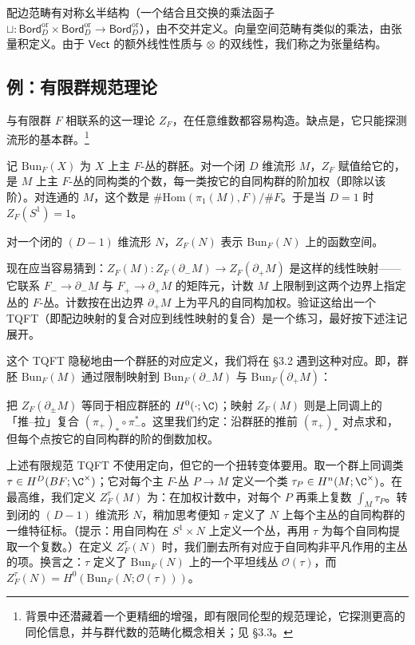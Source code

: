配边范畴有对称幺半结构（一个结合且交换的乘法函子 $\sqcup\colon\mathsf{Bord}^{\mathrm{or}}_D\times\mathsf{Bord}^{\mathrm{or}}_D\to\mathsf{Bord}^{\mathrm{or}}_D$），由不交并定义。向量空间范畴有类似的乘法，由张量积定义。由于 $\mathsf{Vect}$ 的额外线性性质与 $\otimes$ 的双线性，我们称之为张量结构。

\subsection{例：有限群规范理论}

与有限群 $F$ 相联系的这一理论 $Z_F$，在任意维数都容易构造。缺点是，它只能探测流形的基本群。\footnote{背景中还潜藏着一个更精细的增强，即有限同伦型的规范理论，它探测更高的同伦信息，并与群代数的范畴化概念相关；见 §3.3。}

记 $\mathrm{Bun}_F(X)$ 为 $X$ 上主 $F$-丛的群胚。对一个闭 $D$ 维流形 $M$，$Z_F$ 赋值给它的，是 $M$ 上主 $F$-丛的同构类的个数，每一类按它的自同构群的阶加权（即除以该阶）。对连通的 $M$，这个数是 $\#\mathrm{Hom}(\pi_1(M),F)/\#F$。于是当 $D=1$ 时 $Z_F(S^1)=1$。

对一个闭的 $(D-1)$ 维流形 $N$，$Z_F(N)$ 表示 $\mathrm{Bun}_F(N)$ 上的函数空间。

现在应当容易猜到：$Z_F(M)\colon Z_F(\partial_-M)\to Z_F(\partial_+M)$ 是这样的线性映射——它联系 $F_-\to\partial_-M$ 与 $F_+\to\partial_+M$ 的矩阵元，计数 $M$ 上限制到这两个边界上指定丛的 $F$-丛。计数按在出边界 $\partial_+M$ 上为平凡的自同构加权。验证这给出一个 TQFT（即配边映射的复合对应到线性映射的复合）是一个练习，最好按下述注记展开。

\begin{remark}[对应图]
这个 TQFT 隐秘地由一个群胚的对应定义，我们将在 §3.2 遇到这种对应。即，群胚 $\mathrm{Bun}_F(M)$ 通过限制映射到 $\mathrm{Bun}_F(\partial_-M)$ 与 $\mathrm{Bun}_F(\partial_+M)$：
\begin{center}
\end{center}
把 $Z_F(\partial_\pm M)$ 等同于相应群胚的 $H^0(\cdot;\C)$；映射 $Z_F(M)$ 则是上同调上的「推–拉」复合 $(\pi_+)_*\circ\pi_-^*$。这里我们约定：沿群胚的推前 $(\pi_+)_*$ 对点求和，但每个点按它的自同构群的阶的倒数加权。
\end{remark}

\begin{remark}[扭转]
上述有限规范 TQFT 不使用定向，但它的一个扭转变体要用。取一个群上同调类 $\tau\in H^D(BF;\C^\times)$；它对每个主 $F$-丛 $P\to M$ 定义一个类 $\tau_P\in H^n(M;\C^\times)$。在最高维，我们定义 $Z^\tau_F(M)$ 为：在加权计数中，对每个 $P$ 再乘上复数 $\int_M\tau_P$。转到闭的 $(D-1)$ 维流形 $N$，稍加思考便知 $\tau$ 定义了 $N$ 上每个主丛的自同构群的一维特征标。（提示：用自同构在 $S^1\times N$ 上定义一个丛，再用 $\tau$ 为每个自同构提取一个复数。）在定义 $Z^\tau_F(N)$ 时，我们删去所有对应于自同构非平凡作用的主丛的项。换言之：$\tau$ 定义了 $\mathrm{Bun}_F(N)$ 上的一个平坦线丛 $\mathcal{O}(\tau)$，而 $Z^\tau_F(N)=H^0(\mathrm{Bun}_F(N;\mathcal{O}(\tau)))$。
\end{remark}


